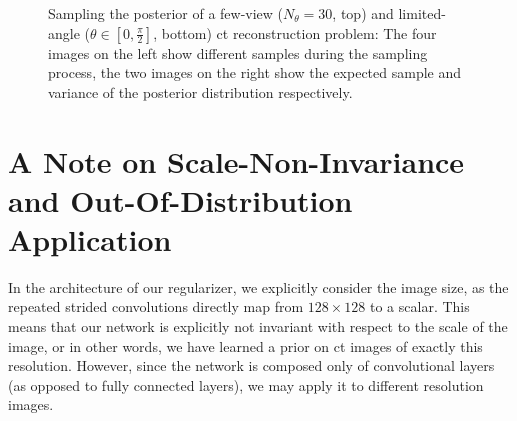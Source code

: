 \documentclass[../ml-ct.tex]{subfiles}
\begin{document}
\begin{figure}
{\begin{tikzpicture}[spy using outlines={rectangle, lens={scale=3}, width=3cm, height=2cm, connect spies}]
	\end{tikzpicture}}
	\caption[Samples, expected value and variance of the posterior of a few-view CT reconstruction problem.]{%
		Sampling the posterior of a few-view (\( N_\theta = 30 \), top) and limited-angle  (\( \theta \in [0, \frac{\pi}{2}]\), bottom) \gls{ct} reconstruction problem:
		The four images on the left show different samples during the sampling process, the two images on the right show the expected sample and variance of the posterior distribution respectively.
	}%
	\label{fig:experiments:posterior-sampling}
\end{figure}
\section{A Note on Scale-Non-Invariance and Out-Of-Distribution Application}
In the architecture of our regularizer, we explicitly consider the image size, as the repeated strided convolutions directly map from \( \num{128} \times \num{128} \) to a scalar.
This means that our network is explicitly not invariant with respect to the scale of the image, or in other words, we have learned a prior on \gls{ct} images of exactly this resolution.  However, since the network is composed only of convolutional layers (as opposed to fully connected layers), we may apply it to different resolution images.
\end{document}
